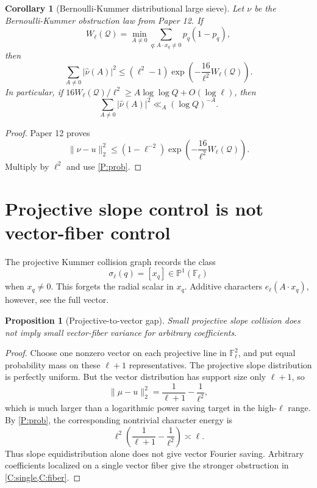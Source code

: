 \documentclass[11pt]{article}
\newtheorem{proposition}{Proposition}
\newtheorem{corollary}{Corollary}
\newcommand{\F}{\mathbb F}
\begin{document}
\begin{corollary}[Bernoulli-Kummer distributional large sieve]\label{C:bernoulli}
Let \(\nu\) be the Bernoulli-Kummer obstruction law from Paper 12.  If
\[
W_\ell(\mathcal Q)=\min_{A\ne0}\sum_{q:A\cdot x_q\ne0}p_q(1-p_q),
\]
then
\[
\sum_{A\ne0}|\widehat\nu(A)|^2
\le
(\ell^2-1)
\exp\left(-\frac{16}{\ell^2}W_\ell(\mathcal Q)\right).
\]
In particular, if \(16W_\ell(\mathcal Q)/\ell^2\ge A\log\log Q+O(\log\ell)\), then
\[
\sum_{A\ne0}|\widehat\nu(A)|^2
\ll_A(\log Q)^{-A}.
\]
\end{corollary}

\begin{proof}
Paper 12 proves
\[
\|\nu-u\|_2^2
\le
(1-\ell^{-2})
\exp\left(-\frac{16}{\ell^2}W_\ell(\mathcal Q)\right).
\]
Multiply by \(\ell^2\) and use \cref{P:prob}.
\end{proof}

\section{Projective slope control is not vector-fiber control}

The projective Kummer collision graph records the class
\[
\sigma_\ell(q)=[x_q]\in\mathbb P^1(\F_\ell)
\]
when \(x_q\ne0\).  This forgets the radial scalar in \(x_q\).  Additive characters \(e_\ell(A\cdot x_q)\), however, see the full vector.

\begin{proposition}[Projective-to-vector gap]\label{P:projective-gap}
Small projective slope collision does not imply small vector-fiber variance for arbitrary coefficients.
\end{proposition}

\begin{proof}
Choose one nonzero vector on each projective line in \(\F_\ell^2\), and put equal probability mass on these \(\ell+1\) representatives.  The projective slope distribution is perfectly uniform.  But the vector distribution has support size only \(\ell+1\), so
\[
\|\mu-u\|_2^2
=
\frac1{\ell+1}-\frac1{\ell^2},
\]
which is much larger than a logarithmic power saving target in the high-\(\ell\) range.  By \cref{P:prob}, the corresponding nontrivial character energy is
\[
\ell^2\left(\frac1{\ell+1}-\frac1{\ell^2}\right)
\asymp \ell.
\]
Thus slope equidistribution alone does not give vector Fourier saving.  Arbitrary coefficients localized on a single vector fiber give the stronger obstruction in \cref{C:single,C:fiber}.
\end{proof}
\end{document}
